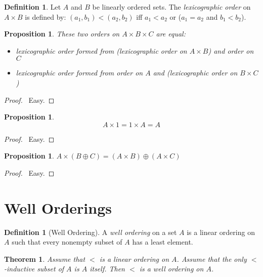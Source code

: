 \documentclass{report}
\let\qed\relax
\newtheorem{proposition}[axiom]{Proposition}
\newtheorem{theorem}[axiom]{Theorem}
\theoremstyle{definition}
\newtheorem{definition}[axiom]{Definition}
\begin{document}
    \begin{definition}
        Let $A$ and $B$ be linearly ordered sets. The \emph{lexicographic order} on $A \times B$ is
        defined by: $(a_1,b_1) < (a_2,b_2)$ iff $a_1 < a_2$ or ($a_1 = a_2$ and $b_1 < b_2$).
    \end{definition}

    \begin{proposition}
        These two orders on $A \times B \times C$ are equal:
        \begin{itemize}
            \item lexicographic order formed from (lexicographic order on $A \times B$) and order on $C$
            \item lexicographic order formed from order on $A$ and (lexicographic order on $B \times C$)
        \end{itemize}
    \end{proposition}

    \begin{proof}
        \pf\ Easy. \qed
    \end{proof}

    \begin{proposition}
        \[ A \times 1 = 1 \times A = A \]
    \end{proposition}

    \begin{proof}
        \pf\ Easy. \qed
    \end{proof}

    \begin{proposition}
        $A \times (B \oplus C) = (A \times B) \oplus (A \times C)$
    \end{proposition}

    \begin{proof}
        \pf\ Easy. \qed
    \end{proof}

    \section{Well Orderings}

    \begin{definition}[Well Ordering]
        A \emph{well ordering} on a set $A$ is a linear ordering on $A$ such that every nonempty subset of
        $A$ has a least element.
    \end{definition}

    \begin{theorem}
        Assume that $<$ is a linear ordering on $A$. Assume that the only $<$-inductive subset of $A$ is $A$
        itself. Then $<$ is a well ordering on $A$.
    \end{theorem}
\end{document}
